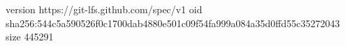 version https://git-lfs.github.com/spec/v1
oid sha256:544c5a590526f0c1700dab4880e501c09f54fa999a084a35d0ffd55c35272043
size 445291
